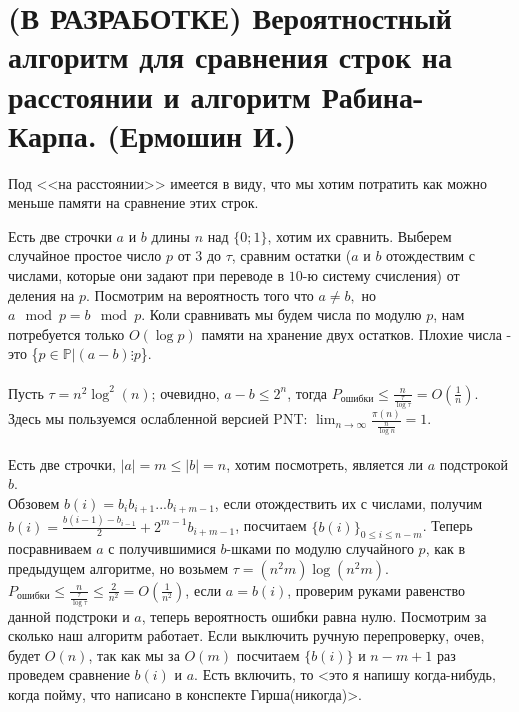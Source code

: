 \section{(В РАЗРАБОТКЕ) Вероятностный алгоритм для сравнения строк на расстоянии и алгоритм Рабина-Карпа. (Ермошин И.)}


Под <<на расстоянии>> имеется в виду, что мы хотим потратить как можно меньше памяти на сравнение этих строк.

Есть две строчки $a$ и $b$ длины $n$ над $\{0;1\}$, хотим их сравнить. Выберем случайное простое число $p$ от $3$ до $\tau$, сравним остатки ($a$ и $b$ отождествим с числами, которые они задают при переводе в $10$-ю систему счисления) от деления на $p$. Посмотрим на вероятность того что $a\neq b,$ но $a\mod{p}=b\mod{p}$. Коли сравнивать мы будем числа по модулю $p$, нам потребуется только $O(\log p)$ памяти на хранение двух остатков.
Плохие числа - это \{$p\in\mathbb{P} | (a-b)\vdots p$\}.
\\
\\Пусть $\tau=n^2 \log^2(n)$; очевидно, $a-b\le 2^n$, тогда $P_{\text{ошибки}}\le\frac{n}{\frac{\tau}{\log\tau}}=O(\frac{1}{n})$. Здесь мы пользуемся ослабленной версией PNT: $\lim_{n\to\infty} \frac{\pi(n)}{\frac{n}{\log n}}=1$.
\\
\\
Есть две строчки, $|a|=m\le|b|=n$, хотим посмотреть, является ли $a$ подстрокой $b$.
\\Обзовем $b(i)=b_i b_{i+1}...b_{i+m-1}$, если отождествить их с числами, получим $b(i)=\frac{b(i-1)-b_{i-1}}{2}+2^{m-1} b_{i+m-1}$, посчитаем $\{b(i)\}_{0\le i\le n-m}$. Теперь посравниваем $a$ с получившимися $b$-шками по модулю случайного $p$, как в предыдущем алгоритме, но возьмем $\tau=(n^2m)\log(n^2m)$.$P_{\text{ошибки}}\le\frac{n}{\frac{\tau}{\log\tau}}\le\frac{2}{n^2}=O(\frac{1}{n^2})$, если $a=b(i)$, проверим руками равенство данной подстроки и $a$, теперь вероятность ошибки равна нулю. Посмотрим за сколько наш алгоритм работает. Если выключить ручную перепроверку, очев, будет $O(n)$, так как мы за $O(m)$ посчитаем $\{b(i)\}$ и $n-m+1$ раз проведем сравнение $b(i)$ и $a$. Есть включить, то <это я напишу когда-нибудь, когда пойму, что написано в конспекте Гирша(никогда)>.
